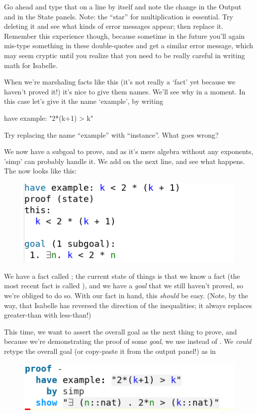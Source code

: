 \task Go ahead and type that on a line by itself and note the change in the Output and in the State panels. Note: the ``star'' for multiplication is essential. Try deleting it and see what kinds of error messages appear; then replace it. Remember this experience though, because sometime in the future you'll again mis-type something in these double-quotes and get a similar error message, which may seem cryptic until you realize that you need to be really careful in writing math for Isabelle.
\etask

When we're marshaling facts like this (it's not really a `fact' yet because we haven't proved it!) it's nice to give them names. We'll see why in a moment. In this case let's give it the name `example', by writing
\begin{IS}
have example: "2*(k+1) > k"    
\end{IS}

\task 
Try replacing the name ``example'' with ``instance''. What goes wrong? 
\etask

We now have a subgoal to prove, and as it's mere algebra without any exponents, 'simp' can probably handle it.  We add  on the next line, and see what happens. The  now looks like this:

\begin{figure}[h]
    \includegraphics[width=0.5\linewidth]{TEXT/C01/Images/proof-state.png}
\end{figure}

We have a fact called ; the current state of things is that we know a fact (the most recent fact is called ), and we have a \textit{goal} that we still haven't proved, so we're obliged to do so. With our fact in hand, this \textit{should} be easy. (Note, by the way, that Isabelle has reversed the direction of the inequalities; it always replaces greater-than with less-than!)

This time, we want to assert the overall goal as the next thing to prove, and because we're demonstrating the proof of some \textit{goal}, we use  instead of . We \textit{could} retype the overall goal (or copy-paste it from the output panel!) as in 
\begin{figure}[h]
    \includegraphics[width=0.5\linewidth]{TEXT/C01/Images/bad-show.png}
\end{figure}

